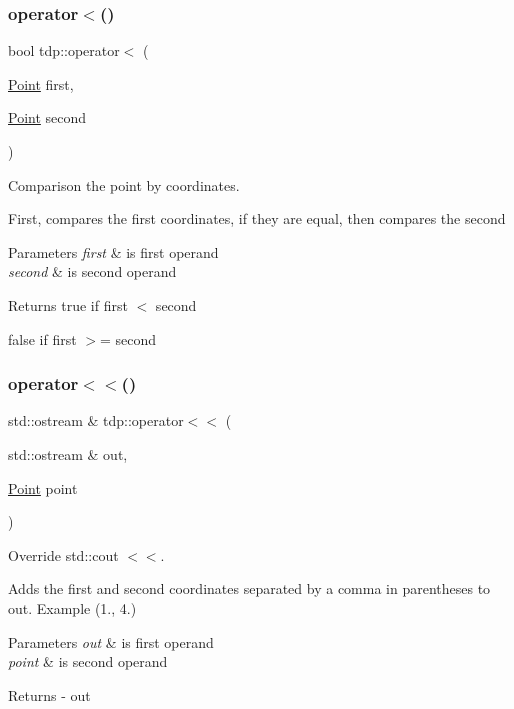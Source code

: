 \subsubsection{\texorpdfstring{operator$<$()}{operator<()}}
{\footnotesize\ttfamily bool tdp\+::operator$<$ (\begin{DoxyParamCaption}\item[{\mbox{\hyperlink{structtdp_1_1_point}{Point}}}]{first,  }\item[{\mbox{\hyperlink{structtdp_1_1_point}{Point}}}]{second }\end{DoxyParamCaption})}



Comparison the point by coordinates. 

First, compares the first coordinates, if they are equal, then compares the second 
\begin{DoxyParams}{Parameters}
{\em first} & is first operand \\
\hline
{\em second} & is second operand \\
\hline
\end{DoxyParams}
\begin{DoxyReturn}{Returns}
true if \textquotesingle{}first\textquotesingle{} $<$ \textquotesingle{}second\textquotesingle{} 

false if \textquotesingle{}first\textquotesingle{} $>$= \textquotesingle{}second\textquotesingle{} 
\end{DoxyReturn}
\mbox{\label{namespacetdp_a40a6deb04f2cc708b0cd33955e23ffb6}} 
\subsubsection{\texorpdfstring{operator$<$$<$()}{operator<<()}}
{\footnotesize\ttfamily std\+::ostream \& tdp\+::operator$<$$<$ (\begin{DoxyParamCaption}\item[{std\+::ostream \&}]{out,  }\item[{\mbox{\hyperlink{structtdp_1_1_point}{Point}}}]{point }\end{DoxyParamCaption})}



Override std\+::cout $<$$<$. 

Adds the first and second coordinates separated by a comma in parentheses to \textquotesingle{}out\textquotesingle{}. Example (1., 4.) 
\begin{DoxyParams}{Parameters}
{\em out} & is first operand \\
\hline
{\em point} & is second operand \\
\hline
\end{DoxyParams}
\begin{DoxyReturn}{Returns}
-\/ out 
\end{DoxyReturn}
\mbox{\label{namespacetdp_a3d677102635fab3ad0088b88378e5b48}} 
